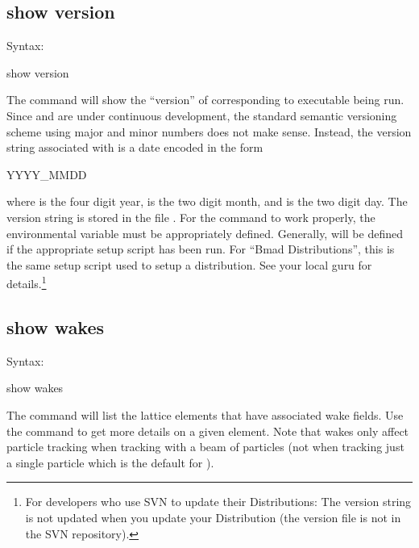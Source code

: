 {{{{{{{{{{%

\subsection{show version}
\label{s:show.version}

Syntax:
\begin{example}
  show version 
\end{example}

The  command will show the ``version'' of \tao corresponding to \tao executable
being run. Since \bmad and \tao are under continuous development, the standard semantic versioning
scheme using major and minor numbers does not make sense. Instead, the version string associated
with \tao is a date encoded in the form
\begin{example}
  YYYY_MMDD
\end{example}
where  is the four digit year,  is the two digit month, and  is the two digit
day. The version string is stored in the file .  For the 
command to work properly, the environmental variable  must be appropriately
defined. Generally,  will be defined if the appropriate \bmad setup script has been
run. For ``Bmad Distributions'', this is the same setup script used to setup a distribution. See
your local \bmad guru for details.\footnote
  {
For developers who use SVN to update their Distributions: The version string is not updated when
you update your Distribution (the version file is not in the SVN repository). 
  }


\subsection{show wakes}
\label{s:show.wakes}

Syntax:
\begin{example}
  show wakes 
\end{example}

The  command will list the lattice elements that have associated wake fields.  Use
the  command to get more details on a given element. Note that wakes only affect
particle tracking when tracking with a beam of particles (not when tracking just a single particle
which is the default for \tao).

}}}}}}}}}}
